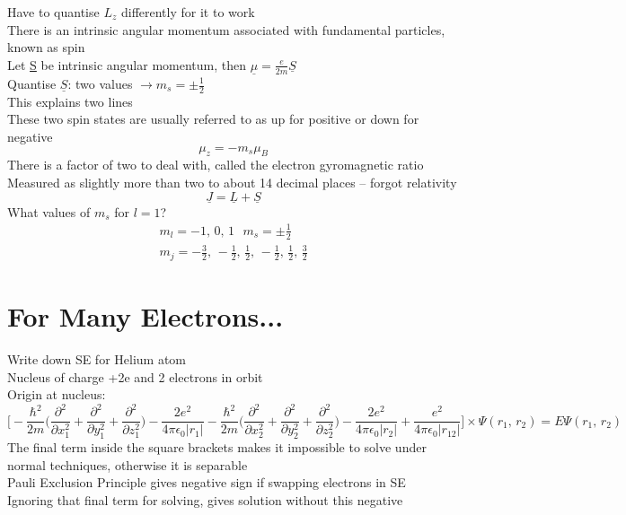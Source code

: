 \documentclass[a4paper, 11pt, fleqn, normalem]{report}
\begin{document}
Have to quantise $L_{z}$ differently for it to work \\
There is an intrinsic angular momentum associated with fundamental particles, known as spin \\
Let \underline{S} be intrinsic angular momentum, then $\underline{\mu} = \frac{e}{2m}\underline{S}$ \\
Quantise $\underline{S}$: two values $\rightarrow m_{s} = \pm \frac{1}{2}$ \\
This explains two lines \\
These two spin states are usually referred to as up for positive or down for negative
\begin{equation*}
    \mu_{z} = -m_{s}\mu_{B}
\end{equation*}
There is a factor of two to deal with, called the electron gyromagnetic ratio \\
Measured as slightly more than two to about 14 decimal places -- forgot relativity
\begin{equation*}
    \underline{J} = \underline{L} + \underline{S}
\end{equation*}
What values of $m_{s}$ for $l = 1$?
\begin{gather*}
    m_{l} = -1,\,0,\,1 ~~~ m_{s} = \pm \frac{1}{2} \\
    m_{j} = -\frac{3}{2},\,-\frac{1}{2},\,\frac{1}{2},\,-\frac{1}{2},\,\frac{1}{2},\,\frac{3}{2}
\end{gather*}

\section{For Many Electrons...}
Write down SE for Helium atom \\
Nucleus of charge +2e and 2 electrons in orbit \\
Origin at nucleus:
\begin{equation*}
    \Bigg[-\frac{\hbar^{2}}{2m}\Big(\frac{\partial^{2}}{\partial x_{1}^{2}} + \frac{\partial^{2}}{\partial y_{1}^{2}} + \frac{\partial^{2}}{\partial z_{1}^{2}}\Big) - \frac{2e^{2}}{4\pi\epsilon_{0}|r_{1}|} - \frac{\hbar^{2}}{2m}\Big(\frac{\partial^{2}}{\partial x_{2}^{2}} + \frac{\partial^{2}}{\partial y_{2}^{2}} + \frac{\partial^{2}}{\partial z_{2}^{2}}\Big) - \frac{2e^{2}}{4\pi\epsilon_{0}|r_{2}|} + \frac{e^{2}}{4\pi\epsilon_{0}|r_{12}|}\Bigg] \times \Psi(r_{1},\,r_{2}) = E\Psi(r_{1},\,r_{2})
\end{equation*}
The final term inside the square brackets makes it impossible to solve under normal techniques, otherwise it is separable \\
Pauli Exclusion Principle gives negative sign if swapping electrons in SE \\
Ignoring that final term for solving, gives solution without this negative
\end{document}
